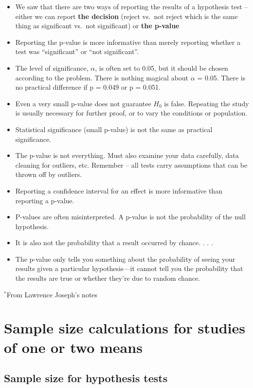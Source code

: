 \documentclass[
]{book}
\providecommand{\tightlist}{%
  \setlength{\itemsep}{0pt}\setlength{\parskip}{0pt}}
\begin{document}
\begin{itemize}
\tightlist
\item
  We saw that there are two ways of reporting the results of a hypothesis test -- either we can report \textbf{the decision} (reject vs.~not reject which is the same thing as significant vs.~not significant) or \textbf{the p-value}
\item
  Reporting the p-value is more informative than merely reporting whether a test was ``significant'' or ``not significant''.
\item
  The level of significance, \(\alpha\), is often set to 0.05, but it should be chosen according to the problem. There is nothing magical about \(\alpha\) = 0.05. There is no practical difference if p = 0.049 or p = 0.051.
\item
  Even a very small p-value does not guarantee \(H_0\) is false. Repeating the study is usually necessary for further proof, or to vary the conditions or population.
\item
  Statistical significance (small p-value) is not the same as practical significance.
\item
  The p-value is not everything. Must also examine your data carefully, data cleaning for outliers, etc. Remember -- all tests carry assumptions that can be thrown off by outliers.
\item
  Reporting a confidence interval for an effect is more informative than reporting a p-value.
\item
  P-values are often misinterpreted. A p-value is not the probability of the null hypothesis.
\item
  It is also not the probability that a result occurred by chance. . . .
\item
  The p-value only tells you something about the probability of seeing your results given a particular hypothesis---it cannot tell you the probability that the results are true or whether they're due to random chance.
\end{itemize}

\(^*\)From Lawrence Joseph's notes

\hypertarget{sample-size-calculations-for-studies-of-one-or-two-means}{%
\section{Sample size calculations for studies of one or two means}\label{sample-size-calculations-for-studies-of-one-or-two-means}}

\hypertarget{sample-size-for-hypothesis-tests}{%
\subsection{Sample size for hypothesis tests}\label{sample-size-for-hypothesis-tests}}
\end{document}
